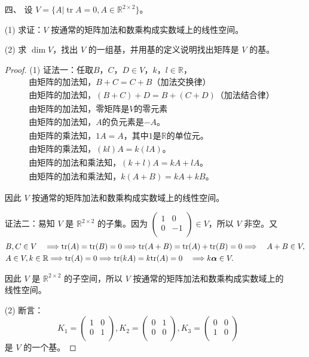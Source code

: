 \begin{enumerate}[1~]
\item[四、]
设 $V = \{ A | \operatorname {tr} A = 0 , A \in \mathbb {R}^{2 \times 2} \}$。

(1) 求证：$V$ 按通常的矩阵加法和数乘构成实数域上的线性空间。

(2) 求 $\dim V$，找出 $V$ 的一组基，并用基的定义说明找出矩阵是 $V$ 的基。

\begin{proof}
(1) 证法一：任取$B$，$C$，$D\in V$，$k$，$l\in \mathbb{R}$，\begin{align*}
&\text{由矩阵的加法知，}B+C=C+B\text{（加法交换律）}\\
&\text{由矩阵的加法知，}(B+C)+D=B+(C+D)\text{（加法结合律）}\\
&\text{由矩阵的加法知，零矩阵是$V$的零元素}\\
&\text{由矩阵的加法知，$A$的负元素是$-A$。}\\
&\text{由矩阵的乘法知，}1A=A\text{，其中$1$是$\mathbb{R}$的单位元。}\\
&\text{由矩阵的乘法知，}(kl)A=k(lA)\text{。}\\
&\text{由矩阵的加法和乘法知，}(k+l)A=kA+lA\text{。}\\
&\text{由矩阵的加法和乘法知，}k(A+B)=kA+kB\text{。}
\end{align*}

因此 $V$ 按通常的矩阵加法和数乘构成实数域上的线性空间。

证法二：易知 $V$ 是 $\mathbb{R}^{2\times 2}$ 的子集。因为 $\left( \begin{smallmatrix}
	1&		0\\
	0&		-1\\
\end{smallmatrix} \right) \in V$，所以 $V$ 非空。又
\begin{align*}
&B , C \in V \quad \Longrightarrow {\rm tr}(A)={\rm tr}(B)=0 \Longrightarrow {\rm tr}(A+B)={\rm tr}(A)+{\rm tr}(B)=0\Longrightarrow \quad A + B \in V,\\
&A \in V , k \in \mathbb{R}\Longrightarrow{\rm tr}(A)=0\Longrightarrow{\rm tr}(kA)=k{\rm tr}(A)=0 \quad \Longrightarrow k \boldsymbol{\alpha} \in V.
\end{align*}

因此 $V$ 是 $\mathbb{R}^{2\times 2}$ 的子空间，所以 $V$ 按通常的矩阵加法和数乘构成实数域上的线性空间。

(2) 断言：
$$
K_1=\left( \begin{matrix}
	1&		0\\
	0&		1\\
\end{matrix} \right) , K_2=\left( \begin{matrix}
	0&		1\\
	0&		0\\
\end{matrix} \right) , K_3=\left( \begin{matrix}
	0&		0\\
	1&		0\\
\end{matrix} \right)
$$
是 $V$ 的一个基。


\end{proof}
\end{enumerate}
